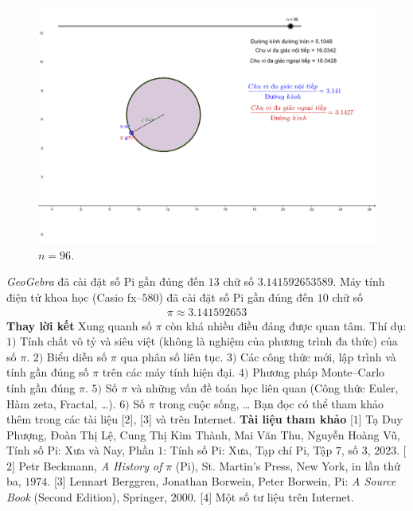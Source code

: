 \begin{multicols}{2}
	\begin{figure}[H]
		\vspace*{-5pt}
		\centering
		\captionsetup{labelformat= empty, justification=centering}
		\includegraphics[width= 1\linewidth]{16}
		\caption{\small\textit{\color{lichsutoanhoc}$n = 96$.}}
		\vspace*{-10pt}
	\end{figure}	
	\textit{GeoGebra} đã cài đặt số Pi gần đúng đến $13$ chữ số $3.141592653589$.
	\vskip 0.1cm  
	Máy tính điện tử khoa học (Casio fx--$580$) đã cài đặt số Pi gần đúng đến $10$ chữ số
	\begin{align*}
		\pi \approx 3.141592653
	\end{align*}
	\textbf{\color{lichsutoanhoc}Thay lời kết}
	\vskip 0.1cm
	Xung quanh số $\pi$  còn khá nhiều điều đáng được quan tâm. Thí dụ:
	\vskip 0.1cm
	$1)$ Tính chất vô tỷ và siêu việt (không là nghiệm của phương trình đa thức) của số $\pi$.
	\vskip 0.1cm  
	$2)$ Biểu diễn số  $\pi$ qua phân số liên tục.
	\vskip 0.1cm
	$3)$ Các công thức mới, lập trình và tính gần đúng số $\pi$  trên các máy tính hiện đại. 
	\vskip 0.1cm
	$4)$ Phương pháp Monte--Carlo tính gần đúng $\pi$.
	\vskip 0.1cm   
	$5)$ Số $\pi$ và những vấn đề toán học liên quan (Công thức Euler, Hàm zeta, Fractal, \ldots).
	\vskip 0.1cm
	$6)$ Số $\pi$ trong cuộc sống, \ldots 
	\vskip 0.1cm
	Bạn đọc có thể tham khảo thêm trong các tài liệu [$2$], [$3$]  và trên Internet. 
	\vskip 0.1cm
	\textbf{\color{lichsutoanhoc}Tài liệu tham khảo}
	\vskip 0.1cm
	[$1$] Tạ Duy Phượng, Đoàn Thị Lệ, Cung Thị Kim Thành, Mai Văn Thu, Nguyễn Hoàng Vũ, Tính số Pi: Xưa và Nay, Phần $1$: Tính số Pi: Xưa, Tạp chí Pi, Tập $7$, số $3$, $2023$.
	\vskip 0.1cm
	[$2$] Petr Beckmann, \textit{A History of} $\pi$ (Pi), St. Martin's Press, New York, in lần thứ ba, $1974$.
	\vskip 0.1cm 
	[$3$] Lennart Berggren, Jonathan Borwein, Peter Borwein, Pi: \textit{A Source Book} (Second Edition), Springer, $2000$.
	\vskip 0.1cm 
	[$4$] Một số tư liệu trên Internet.
\end{multicols}